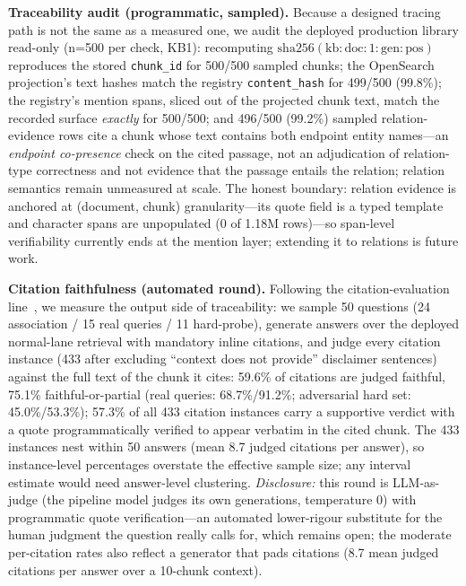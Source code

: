 \documentclass[sigconf,nonacm]{acmart}
\begin{document}
\textbf{Traceability audit (programmatic, sampled).} Because a designed
tracing path is not the same as a measured one, we audit the deployed
production library read-only (n=500 per check, KB1): recomputing
$\mathrm{sha256}(\mathrm{kb}{:}\mathrm{doc}{:}1{:}\mathrm{gen}{:}\mathrm{pos})$
reproduces the stored \texttt{chunk\_id} for 500/500 sampled chunks; the
OpenSearch projection's text hashes match the registry
\texttt{content\_hash} for 499/500 (99.8\%); the registry's mention spans,
sliced out of the projected chunk text, match the recorded surface
\emph{exactly} for 500/500; and 496/500 (99.2\%) sampled relation-evidence
rows cite a chunk whose text contains both endpoint entity names---an
\emph{endpoint co-presence} check on the cited passage, not an
adjudication of relation-type correctness and not evidence that the
passage entails the relation; relation semantics remain unmeasured at
scale. The
honest boundary: relation evidence is anchored at (document, chunk)
granularity---its quote field is a typed template and character spans are
unpopulated (0 of 1.18M rows)---so span-level verifiability currently ends
at the mention layer; extending it to relations is future work.

\textbf{Citation faithfulness (automated round).} Following the citation-evaluation
line~\cite{alce}, we measure the output side of traceability: we sample
50 questions (24 association / 15 real
queries / 11 hard-probe), generate answers over the deployed normal-lane
retrieval with mandatory inline citations, and judge every citation
instance (433 after excluding ``context does not provide'' disclaimer
sentences) against the full text of the chunk it cites: 59.6\% of
citations are judged faithful, 75.1\% faithful-or-partial (real queries:
68.7\%/91.2\%; adversarial hard set: 45.0\%/53.3\%); 57.3\% of all 433
citation instances carry a supportive verdict with a quote
programmatically verified to appear verbatim in the cited chunk. The
433 instances nest within 50 answers (mean 8.7 judged citations per
answer), so
instance-level percentages overstate the effective sample size; any
interval estimate would need answer-level clustering. \emph{Disclosure:}
this round is
LLM-as-judge (the pipeline model judges its own generations, temperature
0) with programmatic quote verification---an automated lower-rigour
substitute for the human judgment the question really calls for, which
remains open; the moderate per-citation rates also reflect a generator
that pads citations (8.7 mean judged citations per answer over a 10-chunk
context).
\end{document}
